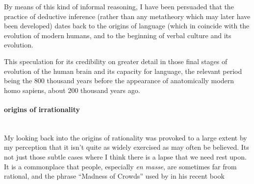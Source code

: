 \documentclass[10pt,titlepage]{book}
\begin{document}
By means of this kind of informal reasoning, I have been persuaded that the practice of deductive inference (rather than any metatheory which may later have been developed) dates back to the origins of language (which in coincide with the evolution of modern humans, and to the beginning of verbal culture and its evolution.

This speculation for its credibility on greater detail in those final stages of evolution of the human brain and its capacity for language, the relevant period being the 800 thousand years before the appearance of anatomically modern homo sapiens, about 200 thousand years ago.

\paragraph{origins of irrationality}~\\

My looking back into the origins of rationality was provoked to a large extent by my perception that it isn't quite as widely exercised as may often be believed.
Its not just those subtle cases where I think there is a lapse that we need rest upon.
It is a commonplace that people, especially \emph{en masse}, are sometimes far from rational, and the phrase ``Madness of Crowds'' used by in his recent book \cite{}




\backmatter


{}








\end{document}
